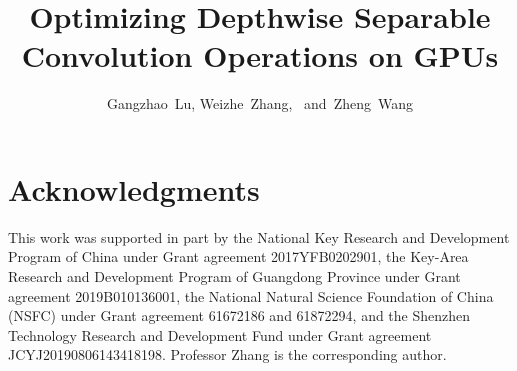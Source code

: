 \documentclass[journal,compsoc,10pt,final]{IEEEtran}
\begin{document}
\title{Optimizing Depthwise Separable Convolution Operations on GPUs}

\author{Gangzhao~Lu, Weizhe~Zhang,~ and~Zheng~Wang
}

\IEEEtitleabstractindextext{

}
\maketitle









\section*{Acknowledgments}
This work was supported in part by the National Key Research and Development Program of China under Grant agreement 2017YFB0202901, the
Key-Area Research and Development Program of Guangdong Province under Grant agreement 2019B010136001, the National Natural Science
Foundation of China (NSFC) under Grant agreement 61672186 and 61872294, and the Shenzhen Technology Research and Development Fund under
Grant agreement JCYJ20190806143418198. Professor Zhang is the corresponding author.
\end{document}
